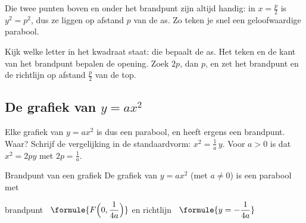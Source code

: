 Die twee punten boven en onder het brandpunt zijn altijd handig: in $x = \tfrac p2$ is $y^2 = p^2$, dus ze liggen op afstand $p$ van de as. Zo teken je snel een geloofwaardige parabool.


\begin{werkwijze}
Kijk welke letter in het kwadraat staat: die bepaalt de as. Het teken en de kant van het brandpunt bepalen de opening. Zoek $2p$, dan $p$, en zet het brandpunt en de richtlijn op afstand $\tfrac p2$ van de top.
\end{werkwijze}


\begin{oefeningen}
\end{oefeningen}

\subsection{De grafiek van \texorpdfstring{$y = ax^2$}{y = ax²}}

Elke grafiek van $y = ax^2$ is dus een parabool, en heeft ergens een brandpunt. Waar? Schrijf de vergelijking in de standaardvorm: $x^2 = \tfrac1a\, y$. Voor $a > 0$ is dat $x^2 = 2py$ met $2p = \tfrac1a$.

\begin{theorie}
\begin{stelling}{Brandpunt van een grafiek}
De grafiek van $y = ax^2$ (met $a \neq 0$) is een parabool met

\vspace{1mm}
\qquad brandpunt \ $\formule{F\Bigl(0, \dfrac{1}{4a}\Bigr)}$ \qquad en richtlijn \ $\formule{y = -\dfrac{1}{4a}}$
\end{stelling}
\end{theorie}

